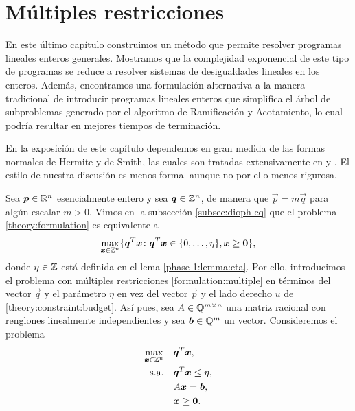 \chapter{Múltiples restricciones}
\noindent
En este último capítulo construimos un método que permite resolver programas lineales enteros
generales. Mostramos que la complejidad exponencial de este tipo de programas se reduce a resolver
sistemas de desigualdades lineales en los enteros. Además, encontramos una formulación alternativa a
la manera tradicional de introducir programas lineales enteros que simplifica el árbol de
subproblemas generado por el algoritmo de Ramificación y Acotamiento, lo cual podría resultar en
mejores tiempos de terminación.

En la exposición de este capítulo dependemos en gran medida de las formas normales de Hermite y de
Smith, las cuales son tratadas extensivamente en \cite{alex} y \cite{morris}. El estilo de nuestra
discusión es menos formal aunque no por ello menos rigurosa.

Sea $\boldsymbol{p} \in \mathbb{R}^n$ esencialmente entero y sea $\boldsymbol{q} \in \mathbb{Z}^n$, de manera que $\vec{p} =
m\vec{q}$ para algún escalar $m > 0$. Vimos en la subsección \ref{subsec:dioph-eq} que el problema
\eqref{theory:formulation} es equivalente a
\begin{equation*}
	\max_{\boldsymbol{x} \in \mathbb{Z}^n}
	\lbrace \boldsymbol{q}^T\boldsymbol{x} \colon \boldsymbol{q}^T\boldsymbol{x} \in \lbrace 0, \ldots, \eta \rbrace, \boldsymbol{x}
	\geq \boldsymbol{0} \rbrace,
\end{equation*}
donde $\eta \in \mathbb{Z}$ está definida en el lema \ref{phase-1:lemma:eta}. Por ello, introducimos el
problema con múltiples restricciones \eqref{formulation:multiple} en términos del vector $\vec{q}$ y
el parámetro $\eta$ en vez del vector $\vec{p}$ y el lado derecho $u$ de
\eqref{theory:constraint:budget}. Así pues, sea $A \in \mathbb{Q}^{m \times n}$ una matriz racional con
renglones linealmente independientes y sea $\boldsymbol{b} \in \mathbb{Q}^m$ un vector. Consideremos el problema
\begin{subequations}
	\label{formulation:multiple}
	\begin{align}
		\max_{\boldsymbol{x} \in \mathbb{Z}^n} \quad
			& \boldsymbol{q}^T\boldsymbol{x}, \label{formulation:multiple:objective} \\
		\text{s.a.} \quad
			& \boldsymbol{q}^T\boldsymbol{x} \leq \eta, \label{formulation:multiple:constraint:budget} \\
			& A\boldsymbol{x} = \boldsymbol{b}, \label{formulation:multiple:constraints} \\
			& \boldsymbol{x} \geq \boldsymbol{0}. \nonumber
	\end{align}
\end{subequations}

